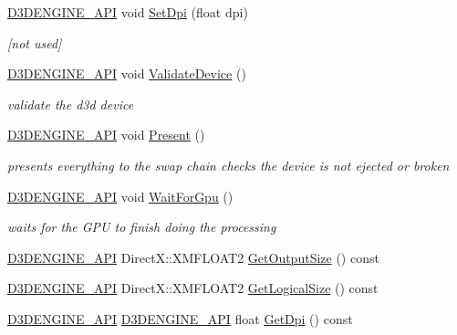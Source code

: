 \begin{DoxyCompactItemize}
\mbox{\hyperlink{stdafx_8h_a8ee2d990c5dfba7794dd2b60741d7722}{D3\+D\+E\+N\+G\+I\+N\+E\+\_\+\+A\+PI}} void \mbox{\hyperlink{class_d_x_1_1_device_resources_a82722ab9c5a11d27664e89b6a375902e}{Set\+Dpi}} (float dpi)
\begin{DoxyCompactList}\small\item\em \mbox{[}not used\mbox{]} \end{DoxyCompactList}\item 
\mbox{\hyperlink{stdafx_8h_a8ee2d990c5dfba7794dd2b60741d7722}{D3\+D\+E\+N\+G\+I\+N\+E\+\_\+\+A\+PI}} void \mbox{\hyperlink{class_d_x_1_1_device_resources_ab6976bc6f653fab6899b53a4b5308b06}{Validate\+Device}} ()
\begin{DoxyCompactList}\small\item\em validate the d3d device \end{DoxyCompactList}\item 
\mbox{\hyperlink{stdafx_8h_a8ee2d990c5dfba7794dd2b60741d7722}{D3\+D\+E\+N\+G\+I\+N\+E\+\_\+\+A\+PI}} void \mbox{\hyperlink{class_d_x_1_1_device_resources_aba74d5a48d23672e6963be1413b054d0}{Present}} ()
\begin{DoxyCompactList}\small\item\em presents everything to the swap chain checks the device is not ejected or broken \end{DoxyCompactList}\item 
\mbox{\hyperlink{stdafx_8h_a8ee2d990c5dfba7794dd2b60741d7722}{D3\+D\+E\+N\+G\+I\+N\+E\+\_\+\+A\+PI}} void \mbox{\hyperlink{class_d_x_1_1_device_resources_a53d3cb840dfc40ef2eecfd993740447f}{Wait\+For\+Gpu}} ()
\begin{DoxyCompactList}\small\item\em waits for the G\+PU to finish doing the processing \end{DoxyCompactList}\item 
\mbox{\hyperlink{stdafx_8h_a8ee2d990c5dfba7794dd2b60741d7722}{D3\+D\+E\+N\+G\+I\+N\+E\+\_\+\+A\+PI}} Direct\+X\+::\+X\+M\+F\+L\+O\+A\+T2 \mbox{\hyperlink{class_d_x_1_1_device_resources_afa4a123452c35ff6208aa97ecbb8a725}{Get\+Output\+Size}} () const
\item 
\mbox{\hyperlink{stdafx_8h_a8ee2d990c5dfba7794dd2b60741d7722}{D3\+D\+E\+N\+G\+I\+N\+E\+\_\+\+A\+PI}} Direct\+X\+::\+X\+M\+F\+L\+O\+A\+T2 \mbox{\hyperlink{class_d_x_1_1_device_resources_a56ec7c2de3ad0d4c5c1447fdacbbdba1}{Get\+Logical\+Size}} () const
\item 
\mbox{\hyperlink{stdafx_8h_a8ee2d990c5dfba7794dd2b60741d7722}{D3\+D\+E\+N\+G\+I\+N\+E\+\_\+\+A\+PI}} \mbox{\hyperlink{stdafx_8h_a8ee2d990c5dfba7794dd2b60741d7722}{D3\+D\+E\+N\+G\+I\+N\+E\+\_\+\+A\+PI}} float \mbox{\hyperlink{class_d_x_1_1_device_resources_a3f921a0e44f6216b90114ba81305baf6}{Get\+Dpi}} () const

\end{DoxyCompactItemize}

